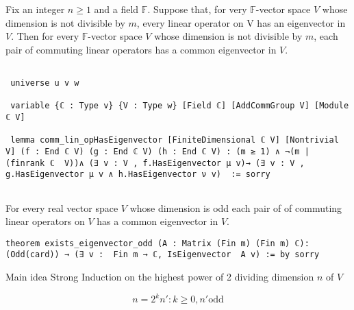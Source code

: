 \documentclass{beamer}
\begin{document}
\begin{frame}[fragile]
    \begin{lemma}
       Fix an integer $n\geq 1$ and a field $\mathbb{F}$. Suppose that, for very $\mathbb{F}$-vector space $V$ whose dimension is not divisible by $m$, every linear operator on V has an eigenvector in $V$. Then for every $\mathbb{F}$-vector space $V$ whose dimension is not divisible by $m$, each pair of commuting linear operators has a common eigenvector in $V$.
    \end{lemma}
    
    \hfill
\begin{lstlisting}[language=Lean, basicstyle=\scriptsize]
    
 universe u v w
 
 variable {ℂ : Type v} {V : Type w} [Field ℂ] [AddCommGroup V] [Module ℂ V]
 
 lemma comm_lin_opHasEigenvector [FiniteDimensional ℂ V] [Nontrivial V] (f : End ℂ V) (g : End ℂ V) (h : End ℂ V) : (m ≥ 1) ∧ ¬(m | (finrank ℂ  V))∧ (∃ v : V , f.HasEigenvector μ v)→ (∃ v : V , g.HasEigenvector μ v ∧ h.HasEigenvector ν v)  := sorry


\end{lstlisting}
\end{frame}

\begin{frame}[fragile]
  \begin{corollary}
      For every real vector space $V$ whose dimension is odd each pair of of commuting linear operators on $V$ has a common eigenvector in $V$.
  \end{corollary}  

\begin{lstlisting}[language=Lean, basicstyle=\scriptsize]
theorem exists_eigenvector_odd (A : Matrix (Fin m) (Fin m) ℂ): (Odd(card)) → (∃ v :  Fin m → ℂ, IsEigenvector  A v) := by sorry
\end{lstlisting}

\end{frame}
\begin{frame}
\begin{block}{Main idea}
    Strong Induction on the highest power of 2 dividing dimension $n$ of $V$
\end{block}
    $$n=2^kn':k\geq0,n' \text{odd}$$
\end{frame}
\end{document}
